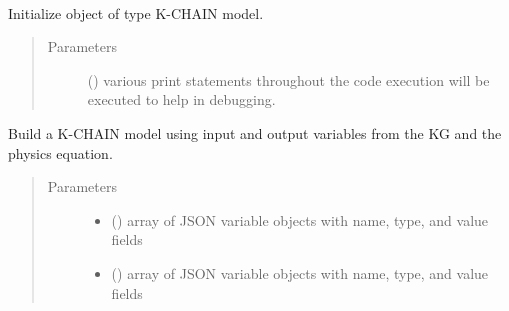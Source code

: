 \documentclass[letterpaper,10pt,english]{sphinxmanual}
\begin{document}
\begin{fulllineitems}
\label{\detokenize{index:kChain.kChainModel}}~

\begin{fulllineitems}
\label{\detokenize{index:kChain.kChainModel.__init__}}
Initialize object of type K-CHAIN model.
\begin{quote}\begin{description}
\item[{Parameters}] \leavevmode
{} () \textendash{} various print statements throughout the code
execution will be executed to help in debugging.

\end{description}\end{quote}

\end{fulllineitems}


\begin{fulllineitems}
\label{\detokenize{index:kChain.kChainModel._createEqnModel}}
Build a K-CHAIN model using input and output variables from the KG and
the physics equation.
\begin{quote}\begin{description}
\item[{Parameters}] \leavevmode\begin{itemize}
\item {} 
 () \textendash{} array of JSON variable objects with name, type, and value fields

\item {} 
 () \textendash{} array of JSON variable objects with name, type, and value fields


\end{itemize}
\end{description}
\end{quote}
\end{fulllineitems}
\end{fulllineitems}
\end{document}
